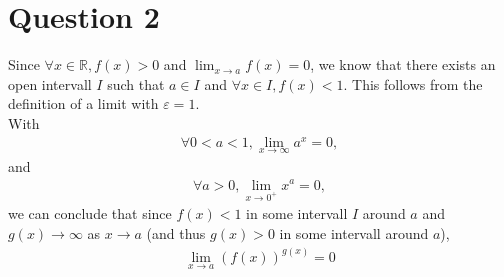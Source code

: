 \documentclass{article}
\begin{document}
\section*{Question 2}
Since $\forall x\in\mathbb{R}, f(x) > 0$ and $\lim_{x\to a}f(x)=0$, we know that there exists an open intervall $I$ such that $a\in I$ and $\forall x\in I, f(x) < 1$. This follows from the definition of a limit with $\varepsilon = 1$.\\
With
\begin{align*}
	\forall 0<a<1, \lim_{x\to\infty}a^x=0,
\end{align*}
and
\begin{align*}
	\forall a>0, \lim_{x\to 0^+}x^a=0,
\end{align*}
we can conclude that since $f(x)<1$ in some intervall $I$ around $a$ and $g(x)\to\infty$ as $x\to a$ (and thus $g(x)>0$ in some intervall around $a$),
\begin{align*}
	\lim_{x\to a}\left(f(x)\right)^{g(x)} = 0
\end{align*}
\end{document}
